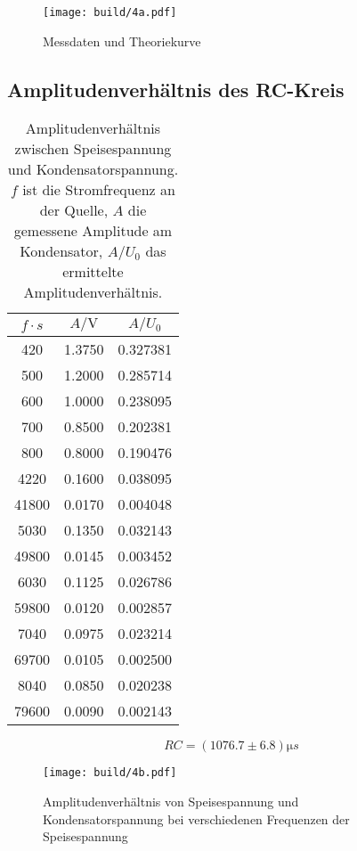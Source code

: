 \begin{figure}[H]
	\centering
	\texttt{[image: build/4a.pdf]}
	\caption{Messdaten und Theoriekurve}
	\label{fig:plot-4a}
\end{figure}


\subsection{Amplitudenverhältnis des RC-Kreis}
\label{sec:4b-auswertung}

\begin{table}
	\centering
	\caption{Amplitudenverhältnis zwischen Speisespannung und Kondensatorspannung.
	$f$ ist die Stromfrequenz an der Quelle, $A$ die gemessene Amplitude am 
	Kondensator, $A/U_0$ das ermittelte Amplitudenverhältnis.}
	\label{tab:messdaten-4c}
	\begin{tabular}{c c c}
		\toprule
		$f \cdot \si{s}$ & $A / \si{\volt}$  & $A / U_0$ \\
		\midrule
		 420   & 1.3750  & 0.327381 \\
	         500  & 1.2000  & 0.285714 \\
	         600  & 1.0000  & 0.238095 \\
	         700  & 0.8500  & 0.202381 \\
	         800  & 0.8000  & 0.190476 \\
	        4220  & 0.1600  & 0.038095 \\
	       41800  & 0.0170  & 0.004048 \\
	        5030  & 0.1350  & 0.032143 \\
	       49800  & 0.0145  & 0.003452 \\
	        6030  & 0.1125  & 0.026786 \\
	       59800  & 0.0120  & 0.002857 \\
	        7040  & 0.0975  & 0.023214 \\
	       69700  & 0.0105  & 0.002500 \\
	        8040  & 0.0850  & 0.020238 \\
	       79600  & 0.0090  & 0.002143 \\
		\bottomrule
	\end{tabular}
\end{table}

\begin{equation}
	RC = (1076.7 \pm 6.8) \si{\micro s}
\end{equation}

\begin{figure}[H]
	\centering
	\texttt{[image: build/4b.pdf]}
	\caption{Amplitudenverhältnis von Speisespannung und Kondensatorspannung bei
	verschiedenen Frequenzen der Speisespannung}
	\label{fig:4b.pdf}
\end{figure}

